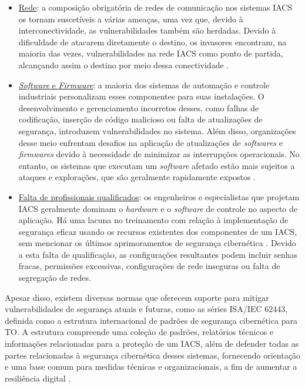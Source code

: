     \begin{itemize}
        \item \underline{Rede}: a composição obrigatória de redes de comunicação nos sistemas IACS os tornam suscetíveis a várias ameaças, uma vez que, devido à interconectividade, as vulnerabilidades também são herdadas. Devido à dificuldade de atacarem diretamente o destino, os invasores encontram, na maioria das vezes, vulnerabilidades na rede IACS como ponto de partida, alcançando assim o destino por meio dessa conectividade \cite{li2020}.
        \item \underline{\textit{Software} e \textit{Firmware}}: a maioria dos sistemas de automação e controle industriais personalizam esses componentes para suas instalações. O desenvolvimento e gerenciamento incorretos desses, como falhas de codificação, inserção de código malicioso ou falta de atualizações de segurança, introduzem vulnerabilidades no sistema. Além disso, organizações desse meio enfrentam desafios na aplicação de atualizações de \textit{softwares} e \textit{firmwares} devido à necessidade de minimizar as interrupções operacionais. No entanto, os sistemas que executam um \textit{software} afetado estão mais sujeitos a ataques e explorações, que são geralmente rapidamente expostos \cite{maidl2021}.
        \item \underline{Falta de profissionais qualificados}: os engenheiros e especialistas que projetam IACS geralmente dominam o \textit{hardware} e o \textit{software} de controle no aspecto de aplicação. Há uma lacuna no treinamento com relação à implementação de segurança eficaz usando os recursos existentes dos componentes de um IACS, sem mencionar os últimos aprimoramentos de segurança cibernética \cite{graham2016}. Devido a esta falta de qualificação, as configurações resultantes podem incluir senhas fracas, permissões excessivas, configurações de rede inseguras ou falta de segregação de redes.
    \end{itemize}

    Apesar disso, existem diversas normas que oferecem suporte para mitigar vulnerabilidades de segurança atuais e futuras, como as séries ISA/IEC 62443, definida como a estrutura internacional de padrões de segurança cibernética para TO. A estrutura compreende uma coleção de padrões, relatórios técnicos e informações relacionadas para a proteção de um IACS, além de defender todas as partes relacionadas à segurança cibernética desses sistemas, fornecendo orientação e uma base comum para medidas técnicas e organizacionais, a fim de aumentar a resiliência digital \cite{wiboonrat2022}. 


